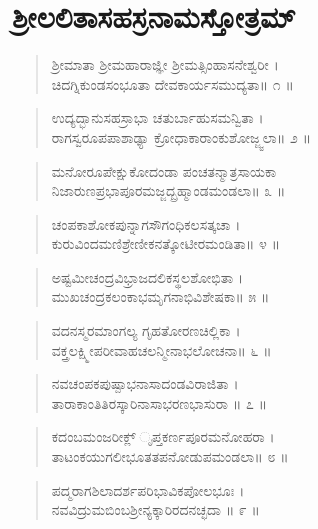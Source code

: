 
\chapter{ಶ್ರೀಲಲಿತಾಸಹಸ್ರನಾಮಸ್ತೋತ್ರಮ್​}

\begin{verse}
ಶ್ರೀಮಾತಾ ಶ್ರೀಮಹಾರಾಜ್ಞೀ ಶ್ರೀಮತ್ಸಿಂಹಾಸನೇಶ್ವರೀ ।\\ಚಿದಗ್ನಿಕುಂಡಸಂಭೂತಾ ದೇವಕಾರ್ಯಸಮುದ್ಯತಾ\num{॥ ೧ ॥}
\end{verse}

\begin{verse}
ಉದ್ಯದ್ಭಾನುಸಹಸ್ರಾಭಾ ಚತುರ್ಬಾಹುಸಮನ್ವಿತಾ ।\\ರಾಗಸ್ವರೂಪಪಾಶಾಢ್ಯಾ ಕ್ರೋಧಾಕಾರಾಂಕುಶೋಜ್ಜ್ವಲಾ\num{॥ ೨ ॥}
\end{verse}

\begin{verse}
ಮನೋರೂಪೇಕ್ಷುಕೋದಂಡಾ ಪಂಚತನ್ಮಾತ್ರಸಾಯಕಾ \\ನಿಜಾರುಣಪ್ರಭಾಪೂರಮಜ್ಜದ್ಬ್ರಹ್ಮಾಂಡಮಂಡಲಾ\num{॥ ೩ ॥}
\end{verse}

\begin{verse}
ಚಂಪಕಾಶೋಕಪುನ್ನಾಗಸೌಗಂಧಿಕಲಸತ್ಕಚಾ ।\\ಕುರುವಿಂದಮಣಿಶ್ರೇಣೀಕನತ್ಕೋಟೀರಮಂಡಿತಾ\num{॥ ೪ ॥}
\end{verse}

\begin{verse}
ಅಷ್ಟಮೀಚಂದ್ರವಿಭ್ರಾಜದಲಿಕಸ್ಥಲಶೋಭಿತಾ ।\\ಮುಖಚಂದ್ರಕಲಂಕಾಭಮೃಗನಾಭಿವಿಶೇಷಕಾ\num{॥ ೫ ॥}
\end{verse}

\begin{verse}
ವದನಸ್ಮರಮಾಂಗಲ್ಯ ಗೃಹತೋರಣಚಿಲ್ಲಿಕಾ ।\\ವಕ್ತ್ರಲಕ್ಷ್ಮೀಪರೀವಾಹಚಲನ್ಮೀನಾಭಲೋಚನಾ\num{॥ ೬ ॥}
\end{verse}

\begin{verse}
ನವಚಂಪಕಪುಷ್ಪಾಭನಾಸಾದಂಡವಿರಾಜಿತಾ ।\\ತಾರಾಕಾಂತಿತಿರಸ್ಕಾರಿನಾಸಾಭರಣಭಾಸುರಾ \num{॥ ೭ ॥}
\end{verse}

\begin{verse}
ಕದಂಬಮಂಜರೀಕ್ಲ್ ೃಪ್ತಕರ್ಣಪೂರಮನೋಹರಾ ।\\ತಾಟಂಕಯುಗಲೀಭೂತತಪನೋಡುಪಮಂಡಲಾ\num{॥ ೮ ॥}
\end{verse}

\begin{verse}
ಪದ್ಮರಾಗಶಿಲಾದರ್ಶಪರಿಭಾವಿಕಪೋಲಭೂಃ ।\\ನವವಿದ್ರುಮಬಿಂಬಶ್ರೀನ್ಯಕ್ಕಾರಿರದನಚ್ಛದಾ \num{॥ ೯ ॥}
\end{verse}

